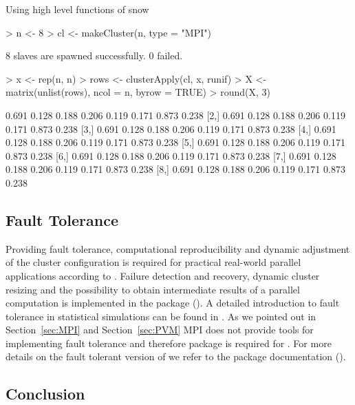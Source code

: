 \begin{Example} Using high level functions of snow
\begin{Schunk}
\begin{Sinput}
> n <- 8
> cl <- makeCluster(n, type = "MPI")
\end{Sinput}
\begin{Soutput}
	8 slaves are spawned successfully. 0 failed.
\end{Soutput}
\begin{Sinput}
> x <- rep(n, n)
> rows <- clusterApply(cl, x, runif)
> X <- matrix(unlist(rows), ncol = n, byrow = TRUE)
> round(X, 3)
\end{Sinput}
\begin{Soutput}
      [,1]  [,2]  [,3]  [,4]  [,5]  [,6]  [,7]  [,8]
[1,] 0.691 0.128 0.188 0.206 0.119 0.171 0.873 0.238
[2,] 0.691 0.128 0.188 0.206 0.119 0.171 0.873 0.238
[3,] 0.691 0.128 0.188 0.206 0.119 0.171 0.873 0.238
[4,] 0.691 0.128 0.188 0.206 0.119 0.171 0.873 0.238
[5,] 0.691 0.128 0.188 0.206 0.119 0.171 0.873 0.238
[6,] 0.691 0.128 0.188 0.206 0.119 0.171 0.873 0.238
[7,] 0.691 0.128 0.188 0.206 0.119 0.171 0.873 0.238
[8,] 0.691 0.128 0.188 0.206 0.119 0.171 0.873 0.238
\end{Soutput}
\end{Schunk}
\label{ex:snowapply}
\end{Example}

\subsection{Fault Tolerance}

Providing fault tolerance, computational reproducibility and dynamic
adjustment of the cluster configuration is required for practical
real-world parallel applications according to
\cite{sevcikova04pragmatic}. Failure detection and recovery, dynamic
cluster resizing and the possibility to obtain intermediate results of
a parallel computation is implemented in the package 
(\cite{sevcikova04snowFT}). A detailed introduction to fault tolerance
in statistical simulations can be found in
\cite{sevcikova04simulations}. As we pointed out in
Section~\ref{sec:MPI} and Section~\ref{sec:PVM} MPI does not provide
tools for implementing fault tolerance and therefore package
 is required for . For more details on the fault
tolerant version of  we refer to the package documentation
(\cite{sevcikova04snowFT}).

\subsection{Conclusion}

